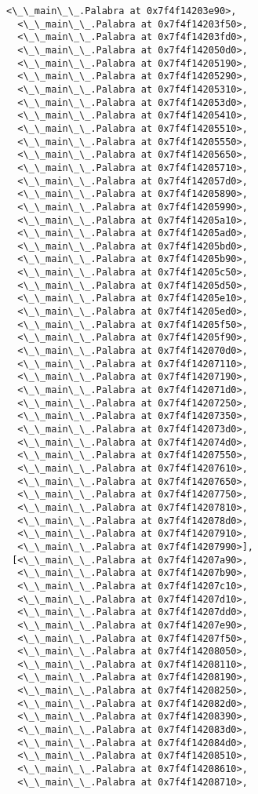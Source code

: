 \documentclass[12pt,a4paper,table]{article}
\begin{document}
\begin{tcolorbox}[breakable, size=fbox, boxrule=.5pt, pad at break*=1mm, opacityfill=0]
\begin{Verbatim}[commandchars=\\\{\}]
  <\_\_main\_\_.Palabra at 0x7f4f14203e90>,
  <\_\_main\_\_.Palabra at 0x7f4f14203f50>,
  <\_\_main\_\_.Palabra at 0x7f4f14203fd0>,
  <\_\_main\_\_.Palabra at 0x7f4f142050d0>,
  <\_\_main\_\_.Palabra at 0x7f4f14205190>,
  <\_\_main\_\_.Palabra at 0x7f4f14205290>,
  <\_\_main\_\_.Palabra at 0x7f4f14205310>,
  <\_\_main\_\_.Palabra at 0x7f4f142053d0>,
  <\_\_main\_\_.Palabra at 0x7f4f14205410>,
  <\_\_main\_\_.Palabra at 0x7f4f14205510>,
  <\_\_main\_\_.Palabra at 0x7f4f14205550>,
  <\_\_main\_\_.Palabra at 0x7f4f14205650>,
  <\_\_main\_\_.Palabra at 0x7f4f14205710>,
  <\_\_main\_\_.Palabra at 0x7f4f142057d0>,
  <\_\_main\_\_.Palabra at 0x7f4f14205890>,
  <\_\_main\_\_.Palabra at 0x7f4f14205990>,
  <\_\_main\_\_.Palabra at 0x7f4f14205a10>,
  <\_\_main\_\_.Palabra at 0x7f4f14205ad0>,
  <\_\_main\_\_.Palabra at 0x7f4f14205bd0>,
  <\_\_main\_\_.Palabra at 0x7f4f14205b90>,
  <\_\_main\_\_.Palabra at 0x7f4f14205c50>,
  <\_\_main\_\_.Palabra at 0x7f4f14205d50>,
  <\_\_main\_\_.Palabra at 0x7f4f14205e10>,
  <\_\_main\_\_.Palabra at 0x7f4f14205ed0>,
  <\_\_main\_\_.Palabra at 0x7f4f14205f50>,
  <\_\_main\_\_.Palabra at 0x7f4f14205f90>,
  <\_\_main\_\_.Palabra at 0x7f4f142070d0>,
  <\_\_main\_\_.Palabra at 0x7f4f14207110>,
  <\_\_main\_\_.Palabra at 0x7f4f14207190>,
  <\_\_main\_\_.Palabra at 0x7f4f142071d0>,
  <\_\_main\_\_.Palabra at 0x7f4f14207250>,
  <\_\_main\_\_.Palabra at 0x7f4f14207350>,
  <\_\_main\_\_.Palabra at 0x7f4f142073d0>,
  <\_\_main\_\_.Palabra at 0x7f4f142074d0>,
  <\_\_main\_\_.Palabra at 0x7f4f14207550>,
  <\_\_main\_\_.Palabra at 0x7f4f14207610>,
  <\_\_main\_\_.Palabra at 0x7f4f14207650>,
  <\_\_main\_\_.Palabra at 0x7f4f14207750>,
  <\_\_main\_\_.Palabra at 0x7f4f14207810>,
  <\_\_main\_\_.Palabra at 0x7f4f142078d0>,
  <\_\_main\_\_.Palabra at 0x7f4f14207910>,
  <\_\_main\_\_.Palabra at 0x7f4f14207990>],
 [<\_\_main\_\_.Palabra at 0x7f4f14207a90>,
  <\_\_main\_\_.Palabra at 0x7f4f14207b90>,
  <\_\_main\_\_.Palabra at 0x7f4f14207c10>,
  <\_\_main\_\_.Palabra at 0x7f4f14207d10>,
  <\_\_main\_\_.Palabra at 0x7f4f14207dd0>,
  <\_\_main\_\_.Palabra at 0x7f4f14207e90>,
  <\_\_main\_\_.Palabra at 0x7f4f14207f50>,
  <\_\_main\_\_.Palabra at 0x7f4f14208050>,
  <\_\_main\_\_.Palabra at 0x7f4f14208110>,
  <\_\_main\_\_.Palabra at 0x7f4f14208190>,
  <\_\_main\_\_.Palabra at 0x7f4f14208250>,
  <\_\_main\_\_.Palabra at 0x7f4f142082d0>,
  <\_\_main\_\_.Palabra at 0x7f4f14208390>,
  <\_\_main\_\_.Palabra at 0x7f4f142083d0>,
  <\_\_main\_\_.Palabra at 0x7f4f142084d0>,
  <\_\_main\_\_.Palabra at 0x7f4f14208510>,
  <\_\_main\_\_.Palabra at 0x7f4f14208610>,
  <\_\_main\_\_.Palabra at 0x7f4f14208710>,

\end{Verbatim}
\end{tcolorbox}
\end{document}

